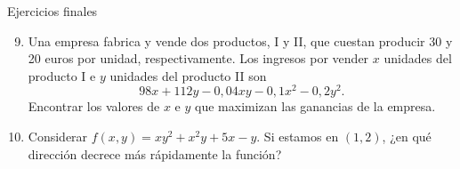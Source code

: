 \documentclass[original_version/main.tex]{subfiles}
\begin{document}
\begin{frame}{Ejercicios finales}
\small\begin{enumerate}\setcounter{enumi}{8}
\item Una empresa fabrica y vende dos productos, I y II, que cuestan producir 30 y 20 euros por unidad, respectivamente. Los ingresos por vender $x$ unidades del producto I e $y$ unidades del producto II son
\[98x+112y-0{,}04xy-0{,}1x^2-0{,}2y^2.\]
Encontrar los valores de $x$ e $y$ que maximizan las ganancias de la empresa.
\item Considerar $f(x,y)=xy^2+x^2y+5x-y$. Si estamos en $(1,2)$, ¿en qué dirección decrece más rápidamente la función?
\end{enumerate}
\end{frame}
\end{document}
